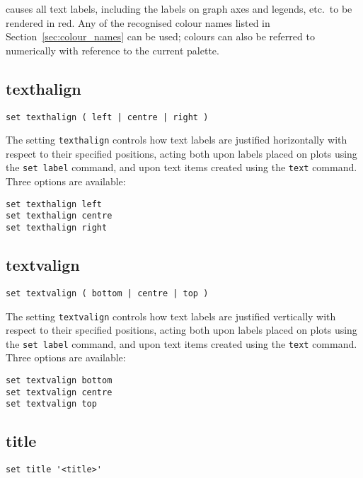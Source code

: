 \noindent causes all text labels, including the labels on graph axes and
legends, etc.\ to be rendered in red. Any of the recognised colour names listed
in Section~\ref{sec:colour_names} can be used; colours can also be referred to
numerically with reference to the current palette.


\subsection{texthalign}

\begin{verbatim}
set texthalign ( left | centre | right )
\end{verbatim}

The setting {\tt texthalign} controls how text labels are justified
horizontally with respect to their specified positions, acting both upon labels
placed on plots using the {\tt set label} command, and upon text items created
using the {\tt text} command. Three options are available:

\begin{verbatim}
set texthalign left
set texthalign centre
set texthalign right
\end{verbatim}


\subsection{textvalign}

\begin{verbatim}
set textvalign ( bottom | centre | top )
\end{verbatim}

The setting {\tt textvalign} controls how text labels are justified vertically
with respect to their specified positions, acting both upon labels placed on
plots using the {\tt set label} command, and upon text items created using the
{\tt text} command. Three options are available:

\begin{verbatim}
set textvalign bottom
set textvalign centre
set textvalign top
\end{verbatim}


\subsection{title}

\begin{verbatim}
set title '<title>'
\end{verbatim}

